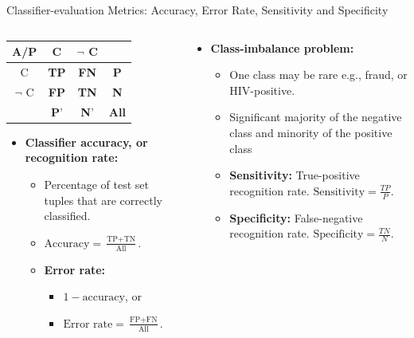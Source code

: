 \begin{frame}{Classifier-evaluation Metrics: Accuracy, Error Rate, Sensitivity and Specificity}
  \begin{columns}
    \begin{column}{0.5\textwidth}
      \centering
      \begin{tabular}{|c|c|c|c|}
        \hline
        A/P & C & $\neg$ C & \\\hline
        C & \textbf{TP} & \textbf{FN} & \textbf{P}\\\hline
        $\neg$ C & \textbf{FP} & \textbf{TN} & \textbf{N} \\\hline
            & \textbf{P}' & \textbf{N}' & \textbf{All}\\\hline
      \end{tabular}
      \begin{itemize}
      \item \textbf{Classifier accuracy, or recognition rate:}
        \begin{itemize}
        \item Percentage of test set tuples that are correctly classified.
        \item $\text{Accuracy} = \frac{\text{TP} + \text{TN}}{\text{All}}.$
        \item \textbf{Error rate:}
          \begin{itemize}
          \item $1-\text{accuracy}$, or
          \item $\text{Error rate} = \frac{\text{FP}+\text{FN}}{\text{All}}.$
          \end{itemize}
        \end{itemize}
      \end{itemize}
    \end{column}
    \begin{column}{0.5\textwidth}
      \begin{itemize}
      \item \textbf{Class-imbalance problem:}
        \begin{itemize}
        \item One class may be rare e.g., fraud, or HIV-positive.
        \item Significant majority of the negative class and minority of the positive class
        \item \textbf{Sensitivity:} True-positive recognition rate. $\text{Sensitivity} = \frac{TP}{P}$.
        \item \textbf{Specificity:} False-negative recognition rate. $\text{Specificity} = \frac{TN}{N}$.
        \end{itemize}
      \end{itemize}
    \end{column}
  \end{columns}
\end{frame}

